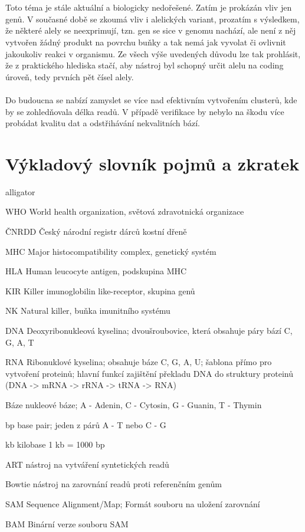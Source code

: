 \documentclass[czech,DP]{thesiskiv}
\numberwithin{equation}{section}
\begin{document}
\\
\\
Toto téma je stále aktuální a biologicky nedořešené. Zatím je prokázán vliv jen genů. V současné době se zkoumá vliv i alelických variant, prozatím s výsledkem, že některé alely se neexprimují, tzn. gen se sice v genomu nachází, ale není z něj vytvořen žádný produkt na povrchu buňky a tak nemá jak vyvolat či ovlivnit jakoukoliv reakci v organismu. Ze všech výše uvedených důvodu lze tak prohlásit, že z praktického hlediska stačí, aby nástroj byl schopný určit alelu na coding úroveň, tedy prvních pět čísel alely. 
\\
\\
Do budoucna se nabízí zamyslet se více nad efektivním vytvořením clusterů, kde by se zohledňovala délka readů. V případě verifikace by nebylo na škodu více probádat kvalitu dat a odstřihávání nekvalitních bází. 


\chapter{Výkladový slovník pojmů a zkratek}

\begin{labeling}{alligator}
	\item [WHO] World health organization, světová zdravotnická organizace
	\item [ČNRDD] Český národní registr dárců kostní dřeně
	\item [MHC] Major histocompatibility complex, genetický systém	
	\item [HLA] Human leucocyte antigen, podskupina MHC
	\item [KIR] Killer imunoglobilin like-receptor, skupina genů
	\item [NK] Natural killer, buňka imunitního systému
	\item [DNA] Deoxyribonukleová kyselina; dvoušroubovice, která obsahuje páry bází C, G, A, T 
	\item [RNA] Ribonuklové kyselina; obsahuje báze C, G, A, U; šablona přímo pro vytvoření proteinů; hlavní funkcí zajištění překladu DNA do struktury proteinů (DNA -> mRNA -> rRNA -> tRNA -> RNA) 
	\item [Báze] nukleové báze; A - Adenin, C - Cytosin, G - Guanin, T - Thymin
	\item [bp] base pair; jeden z párů A - T nebo C - G
	\item [kb] kilobase 1 kb = 1000 bp
	\item [ART] nástroj na vytváření syntetických readů
	\item [Bowtie] nástroj na zarovnání readů proti referenčním genům
	\item [SAM] Sequence Alignment/Map; Formát souboru na uložení zarovnání
	\item [BAM] Binární verze souboru SAM
\end{labeling}
\end{document}
